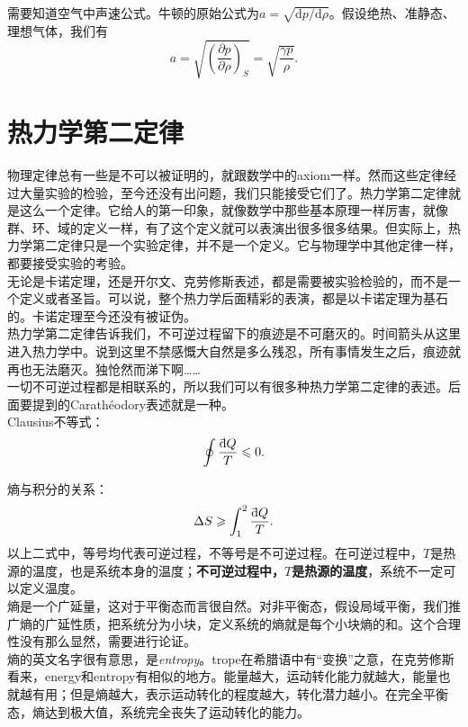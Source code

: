 \documentclass[UTF8]{ctexart}
\newcommand{\dbar}{\mathrm{\mathchar'26\mkern-9mu d}}
\newcommand{\md}{\mathrm{d}}
\numberwithin{equation}{subsection}
\begin{document}
需要知道空气中声速公式。牛顿的原始公式为$a=\sqrt{\md p/\md \rho}$。假设绝热、准静态、理想气体，我们有
\[a=\sqrt{\left(\frac{\partial p}{\partial \rho}\right)_{S}}=\sqrt{\frac{\gamma p}{\rho}}.\]

\section{热力学第二定律}
物理定律总有一些是不可以被证明的，就跟数学中的axiom一样。然而这些定律经过大量实验的检验，至今还没有出问题，我们只能接受它们了。热力学第二定律就是这么一个定律。它给人的第一印象，就像数学中那些基本原理一样厉害，就像群、环、域的定义一样，有了这个定义就可以表演出很多很多结果。但实际上，热力学第二定律只是一个实验定律，并不是一个定义。它与物理学中其他定律一样，都要接受实验的考验。\\

无论是卡诺定理，还是开尔文、克劳修斯表述，都是需要被实验检验的，而不是一个定义或者圣旨。可以说，整个热力学后面精彩的表演，都是以卡诺定理为基石的。卡诺定理至今还没有被证伪。\\

热力学第二定律告诉我们，不可逆过程留下的痕迹是不可磨灭的。时间箭头从这里进入热力学中。说到这里不禁感慨大自然是多么残忍，所有事情发生之后，痕迹就再也无法磨灭。独怆然而涕下啊……\\

一切不可逆过程都是相联系的，所以我们可以有很多种热力学第二定律的表述。后面要提到的Carath\'{e}odory表述就是一种。\\

Clausius不等式：
\begin{equation}\label{clausius}
\oint \frac{\dbar Q}{T}\leqslant 0.
\end{equation}

熵与积分的关系：
\begin{equation}\label{s}
\Delta S\geqslant\int_{1}^{2}\frac{\dbar Q}{T}.
\end{equation}
以上二式中，等号均代表可逆过程，不等号是不可逆过程。在可逆过程中，$T$是热源的温度，也是系统本身的温度；\textbf{不可逆过程中，$T$是热源的温度}，系统不一定可以定义温度。\\


熵是一个广延量，这对于平衡态而言很自然。对非平衡态，假设局域平衡，我们推广熵的广延性质，把系统分为小块，定义系统的熵就是每个小块熵的和。这个合理性没有那么显然，需要进行论证。\\

熵的英文名字很有意思，是\textit{entropy}。trope在希腊语中有“变换”之意，在克劳修斯看来，energy和entropy有相似的地方。能量越大，运动转化能力就越大，能量也就越有用；但是熵越大，表示运动转化的程度越大，转化潜力越小。在完全平衡态，熵达到极大值，系统完全丧失了运动转化的能力。\\
\end{document}
